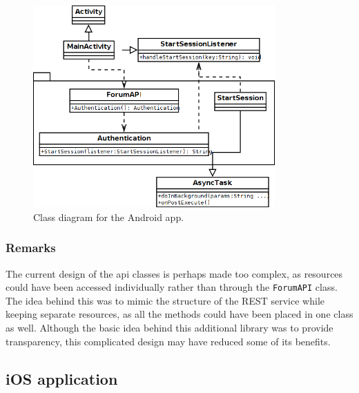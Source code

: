 %

%

%

\begin{figure}
	\begin{center}
		\includegraphics[width=350px]{img/android_class_diagram}
		\caption{Class diagram for the Android app.}
		\label{figure:android:classdiagram}
	\end{center}
\end{figure}

\subsubsection{Remarks}

The current design of the api classes is perhaps made too complex, as resources could have been accessed individually rather than through the \texttt{ForumAPI} class. The idea behind this was to mimic the structure of the REST service while keeping separate resources, as all the methods could have been placed in one class as well. Although the basic idea behind this additional library was to provide transparency, this complicated design may have reduced some of its benefits.


\subsection{iOS application}

